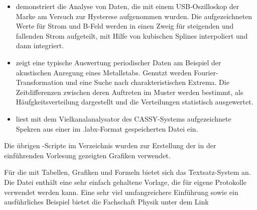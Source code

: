 \documentclass[letterpaper,10pt,english]{sphinxmanual}
\begin{document}
\begin{description}
\begin{itemize}
\item {} 
 demonstriert die Analyse von Daten,
die mit einem USB-Oszilloskop der Marke  am
Versuch zur Hysterese aufgenommen wurden. Die aufgezeichneten Werte
für Strom und B-Feld werden in einen Zweig für steigenden und
fallenden Strom aufgeteilt, mit Hilfe von kubischen Splines
interpoliert und dann integriert.

\item {} 
  zeigt eine typische Auswertung
periodischer Daten am Beispiel der akustischen Anregung eines
Metallstabs. Genutzt werden Fourier-Transformation und
eine Suche nach charakteristischen Extrema. Die Zeitdifferenzen
zwischen deren Auftreten im Muster werden bestimmt, als
Häufgkeitsverteilung dargestellt und die Verteilungen statistisch
ausgewertet.

\item {} 
 liest mit dem Vielkanalanalysator
des CASSY-Systems aufgezeichnete Spekren aus einer im .labx-Format
gespeicherten Datei ein.

\end{itemize}

\end{description}

Die übrigen -Scripte im Verzeichnis wurden zur Erstellung
der in der einführenden Vorlesung gezeigten Grafiken verwendet.

Für die  mit Tabellen, Grafiken und Formeln
bietet sich das Textsatz-System  an. Die Datei
enthält eine sehr einfach gehaltene Vorlage, die für eigene Protokolle
verwendet werden kann. Eine sehr viel umfangreichere Einführung sowie
ein ausführliches Beispiel bietet die Fachschaft Physik unter dem
Link 
\end{document}
